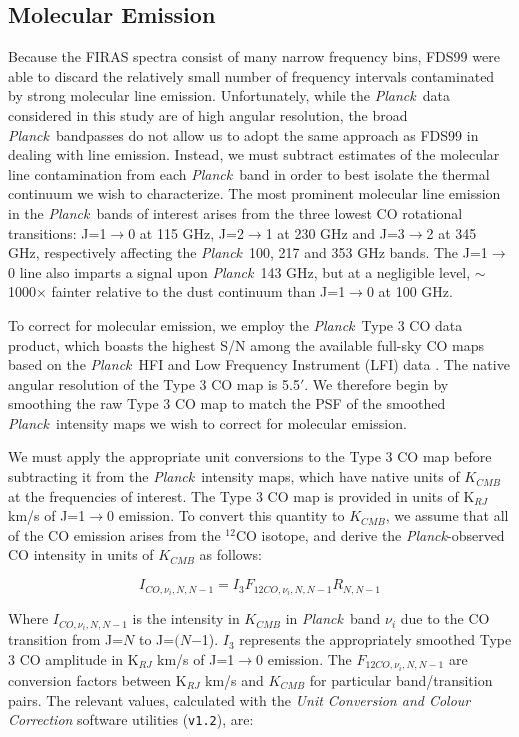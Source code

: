 \documentclass{emulateapj}
\newcommand{\PLANCK}{{\it Planck}}
\begin{document}
\subsection{Molecular Emission}
\label{sec:mole}
Because the FIRAS spectra consist of many narrow frequency bins, FDS99 were
able to discard the relatively small number of frequency intervals contaminated
by strong molecular line emission. Unfortunately, while the \PLANCK~data 
considered in this study are of high angular resolution, the broad 
\PLANCK~bandpasses do not allow us to adopt the same approach as FDS99 in 
dealing with line emission. Instead, we must subtract estimates of the 
molecular line contamination from each \PLANCK~band in order to best isolate 
the thermal continuum we wish to characterize. The most prominent molecular 
line emission in the \PLANCK~bands of interest arises from the three lowest CO 
rotational transitions: J=1$\rightarrow$0 at 115 GHz, J=2$\rightarrow$1 at 230 
GHz and J=3$\rightarrow$2 at 345 GHz, respectively affecting the \PLANCK~100, 
217 and 353 GHz bands. The J=1$\rightarrow$0 line also imparts a signal upon 
\PLANCK~143 GHz, but at a negligible level, $\sim$1000$\times$ fainter relative
to the dust continuum than J=1$\rightarrow$0 at 100 GHz.

To correct for molecular emission, we employ the \PLANCK~Type 3 CO data 
product, which boasts the highest S/N among the available full-sky CO maps 
based on the \PLANCK~HFI and Low Frequency Instrument (LFI) data 
\citep{planckco}. The native angular resolution of the Type 3 CO map is 5.5$'$.
We therefore begin by smoothing the raw Type 3 CO map to match the PSF of the 
smoothed \PLANCK~intensity maps we wish to correct for molecular emission.

We must apply the appropriate unit conversions to the Type 3 CO map before 
subtracting it from the \PLANCK~intensity maps, which have native units of 
$K_{CMB}$ at the frequencies of interest. The Type 3 CO map is provided in 
units of K$_{RJ}$ km/s of J=1$\rightarrow$0 emission. To convert this quantity 
to $K_{CMB}$, we assume that all of the CO emission arises from the $^{12}$CO 
isotope, and derive the \PLANCK-observed CO intensity in units of $K_{CMB}$ as
follows:

\begin{equation}
I_{CO, \nu_i, N, N-1} = I_{3}F_{12CO, \nu_i, N, N-1} R_{N, N-1}
\end{equation}

Where $I_{CO, \nu_i, N, N-1}$ is the intensity in $K_{CMB}$ in \PLANCK~band 
$\nu_i$ due to the CO transition from J=$N$ to J=$(N$$-$1). $I_3$ represents 
the appropriately smoothed Type 3 CO amplitude in  K$_{RJ}$ km/s of 
J=1$\rightarrow$0 emission. The $F_{12CO, \nu_i, N, N-1}$ are conversion 
factors between K$_{RJ}$ km/s and $K_{CMB}$ for particular band/transition 
pairs. The relevant values, calculated with the \textit{Unit Conversion and 
Colour Correction} software utilities (\verb|v1.2|), are:
\end{document}

